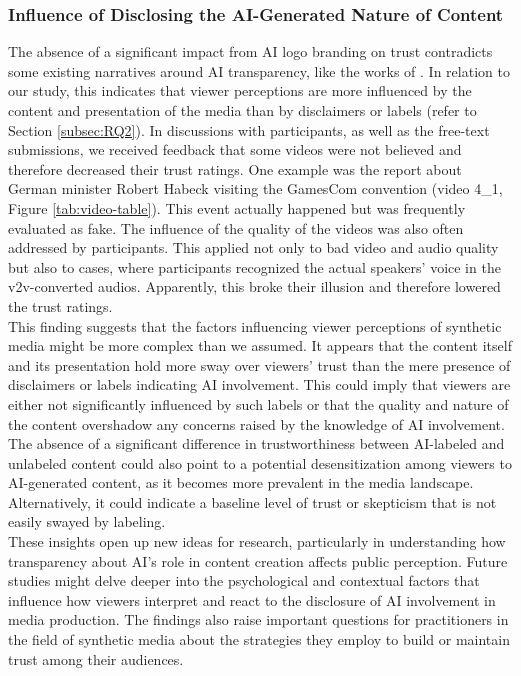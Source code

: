 \documentclass[
  a4paper,  %
  twoside,  %
  bibliography=totoc,
  headsepline,
  cleardoublepage=empty,
  parskip=half,
  draft=false
]{scrbook}
\begin{document}
\subsubsection{Influence of Disclosing the AI-Generated Nature of Content}
The absence of a significant impact from AI logo branding on trust contradicts some existing narratives around AI transparency, like the works of . In relation to our study, this indicates that viewer perceptions are more influenced by the content and presentation of the media than by disclaimers or labels (refer to Section \ref{subsec:RQ2}). In discussions with participants, as well as the free-text submissions, we received feedback that some videos were not believed and therefore decreased their trust ratings. One example was the report about German minister Robert Habeck visiting the GamesCom convention (video 4\_1, Figure \ref{tab:video-table}). This event actually happened but was frequently evaluated as fake. The influence of the quality of the videos was also often addressed by participants. This applied not only to bad video and audio quality but also to cases, where participants recognized the actual speakers' voice in the \gls{v2v}-converted audios. Apparently, this broke their illusion and therefore lowered the trust ratings. \\
This finding suggests that the factors influencing viewer perceptions of synthetic media might be more complex than we assumed. It appears that the content itself and its presentation hold more sway over viewers' trust than the mere presence of disclaimers or labels indicating AI involvement. This could imply that viewers are either not significantly influenced by such labels or that the quality and nature of the content overshadow any concerns raised by the knowledge of AI involvement. The absence of a significant difference in trustworthiness between AI-labeled and unlabeled content could also point to a potential desensitization among viewers to AI-generated content, as it becomes more prevalent in the media landscape. Alternatively, it could indicate a baseline level of trust or skepticism that is not easily swayed by labeling. \\
These insights open up new ideas for research, particularly in understanding how transparency about AI's role in content creation affects public perception. Future studies might delve deeper into the psychological and contextual factors that influence how viewers interpret and react to the disclosure of AI involvement in media production. The findings also raise important questions for practitioners in the field of synthetic media about the strategies they employ to build or maintain trust among their audiences.
\end{document}
